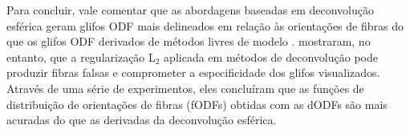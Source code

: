 
Para concluir, vale comentar que as abordagens baseadas em deconvolução esférica \cite{Tournier2004DirectEO, tournier2007} geram glifos ODF mais delineados em relação às orientações de fibras do que os glifos ODF derivados de métodos livres de modelo \cite{dellacqua2019}.  mostraram, no entanto, que a regularização L$_2$ aplicada em métodos de deconvolução pode produzir fibras falsas e comprometer a especificidade dos glifos visualizados. Através de uma série de experimentos, eles concluíram que as funções de distribuição de orientações de fibras (fODFs) obtidas com as dODFs são mais acuradas do que as derivadas da deconvolução esférica.





